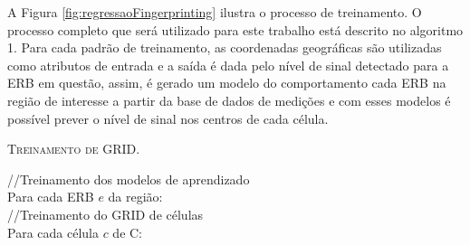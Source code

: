 \documentclass[12pt]{article}
\begin{document}
				A Figura \ref{fig:regressaoFingerprinting} ilustra o processo de treinamento. O processo completo que será utilizado para este trabalho está descrito no algoritmo 1. Para cada padrão de treinamento, as coordenadas geográficas são utilizadas como atributos de entrada e a saída é dada pelo nível de sinal detectado para a ERB em questão, assim, é gerado um modelo do comportamento cada ERB na região de interesse a partir da base de dados de medições e com esses modelos é possível prever o nível de sinal nos centros de cada célula.
                        
                        \vspace*{5mm}
                        \begin{algorithm}[H]
                            \label{alg:treinamentoGrid}
                            \caption{\textsc{Treinamento de GRID}.}
                            \SetAlgoLined
                            
                            
                            \vspace*{3mm}
                            //Treinamento dos modelos de aprendizado\\
                            Para cada ERB $e$ da região:\\
                            \vspace*{3mm}
                            //Treinamento do GRID de células\\
                            Para cada célula $c$ de C:\\
                        \end{algorithm}
                        \vspace*{5mm}
				
\end{document}
